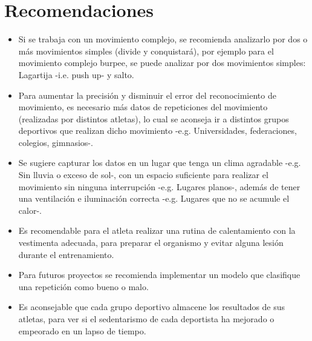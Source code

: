 \section{Recomendaciones} \label{ded:rec}
\begin{itemize}
\item Si se trabaja con un movimiento complejo, se recomienda analizarlo por dos o m\'as movimientos simples (divide y conquistar\'a), por ejemplo para el movimiento complejo burpee, se puede analizar por dos movimientos simples: Lagartija -i.e. push up- y salto.
\item Para aumentar la precisi\'on y disminuir el error del reconocimiento de movimiento, es necesario m\'as datos de  repeticiones del movimiento (realizadas por distintos atletas), lo cual se aconseja ir a distintos grupos deportivos que realizan dicho movimiento -e.g. Universidades, federaciones, colegios, gimnasios-.
\item Se sugiere capturar los datos en un  lugar que tenga un clima agradable -e.g. Sin lluvia o exceso de sol-, con un espacio suficiente para realizar el movimiento sin ninguna interrupci\'on -e.g. Lugares planos-, adem\'as de tener una  ventilaci\'on e iluminaci\'on correcta -e.g. Lugares que no se acumule  el calor-.
\item Es recomendable para el atleta realizar una rutina de calentamiento con la vestimenta adecuada, para preparar el organismo y evitar alguna lesi\'on durante el entrenamiento.
\item Para futuros proyectos se recomienda implementar un modelo que clasifique una repetici\'on como bueno o malo.
\item Es aconsejable que cada grupo deportivo almacene los resultados de sus atletas, para ver si el sedentarismo de cada deportista ha mejorado o empeorado en un lapso de tiempo.
\end{itemize}